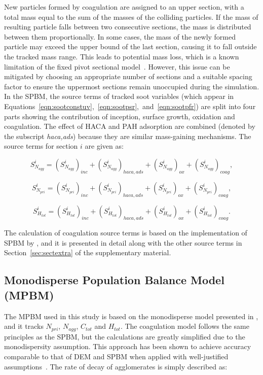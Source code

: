 New particles formed by coagulation are assigned to an upper section, with a total mass equal to the sum of the masses of the colliding particles. If the mass of resulting particle falls between two consecutive sections, the mass is distributed between them proportionally. In some cases, the mass of the newly formed particle may exceed the upper bound of the last section, causing it to fall outside the tracked mass range. This leads to potential mass loss, which is a known limitation of the fixed pivot sectional model~\citep{zhang2010detailed}. However, this issue can be mitigated by choosing an appropriate number of sections and a suitable spacing factor to ensure the uppermost sections remain unoccupied during the simulation. In the SPBM, the source terms of tracked soot variables (which appear in Equations~\ref{eqn:sootconstuv},~\ref{eqn:sootpsr},~and~\ref{eqn:sootpfr}) are split into four parts showing the contribution of inception, surface growth, oxidation and coagulation. The effect of HACA and PAH adsorption are combined (denoted by the subscript \textit{haca,ads}) because they are similar mass-gaining mechanisms. The source terms for section $i$ are given as:

\begin{equation}
	S^i_{N_{agg}} = 
	\left(S^i_{N_{agg}}\right)_{inc}
	+\left(S^i_{N_{agg}}\right)_{haca, ads}
	+\left(S^i_{N_{agg}}\right)_{ox}
	+\left(S^i_{N_{agg}}\right)_{coag}
	\label{eqn:S_Naggsect},
\end{equation}

\begin{equation}
	S^i_{N_{pri}} = 
	\left(S^i_{N_{pri}}\right)_{inc}
	+\left(S^i_{N_{pri}}\right)_{haca, ads}
	+\left(S^i_{N_{pri}}\right)_{ox}
	+\left(S^i_{N_{pri}}\right)_{coag}
	\label{eqn:S_Nprisect},
\end{equation}

\begin{equation}
	S^i_{H_{tot}} = 
	\left(S^i_{H_{tot}}\right)_{inc}
	+\left(S^i_{H_{tot}}\right)_{haca, ads}
	+\left(S^i_{H_{tot}}\right)_{ox}
	+\left(S^i_{H_{tot}}\right)_{coag}
	\label{eqn:S_Htotsect}.
\end{equation}

The calculation of coagulation source terms is based on the implementation of SPBM by \citet{veshkini2015understanding}, and it is presented in detail along with the other source terms in Section~\ref{sec:sectextra} of the supplementary material.


\subsection{Monodisperse Population Balance Model (MPBM)}
\label{sec:mpbm}
The MPBM used in this study is based on the monodisperse model presented in \citep{kholghy2021surface}, and it tracks $N_{pri}$, $N_{agg}$, $C_{tot}$ and $H_{tot}$. The coagulation model follows the same principles as the SPBM, but the calculations are greatly simplified due to the monodispersity assumption. This approach has been shown to achieve accuracy comparable to that of DEM and SPBM when applied with well-justified assumptions~\citep{Kelesidis2017Flame, kelesidis2019estimating}. The rate of decay of agglomerates is simply described as:

